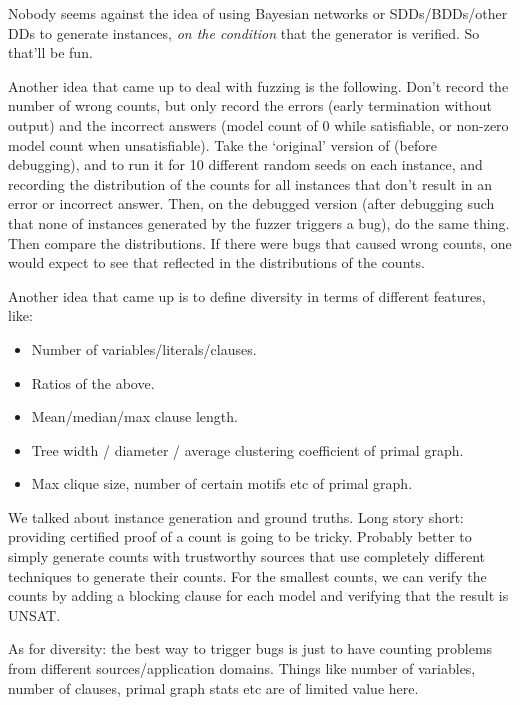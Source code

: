 \documentclass[a4paper]{tufte-handout}
\begin{document}
	Nobody seems against the idea of using Bayesian networks or SDDs/BDDs/other DDs to generate instances, {\em on the condition} that the generator is verified.
	So that'll be fun.
	
	Another idea that came up to deal with fuzzing \approxmc{} is the following. 
	Don't record the number of wrong counts, but only record the errors (early termination without output) and the incorrect answers (model count of 0 while satisfiable, or non-zero model count when unsatisfiable). 
	Take the `original' version of \approxmc{} (before debugging), and to run it for 10 different random seeds on each instance, and recording the distribution of the counts for all instances that don't result in an error or incorrect answer. 
	Then, on the debugged version (after debugging such that none of instances generated by the fuzzer triggers a bug), do the same thing.
	Then compare the distributions.
	If there were bugs that caused wrong counts, one would expect to see that reflected in the distributions of the counts.
	
	Another idea that came up is to define diversity in terms of different features, like:
	\begin{itemize}
		\item Number of variables/literals/clauses.
		\item Ratios of the above.
		\item Mean/median/max clause length.
		\item Tree width / diameter / average clustering coefficient of primal graph.
		\item Max clique size, number of certain motifs etc of primal graph.
	\end{itemize}
	
	\noindent\hrulefill
	
	
	
	We talked about instance generation and ground truths.
	Long story short: providing certified proof of a count is going to be tricky.
	Probably better to simply generate counts with trustworthy sources that use completely different techniques to generate their counts.
	For the smallest counts, we can verify the counts by adding a blocking clause for each model and verifying that the result is UNSAT.
	
	As for diversity: the best way to trigger bugs is just to have counting problems from different sources/application domains.
	Things like number of variables, number of clauses, primal graph stats etc are of limited value here.
	
\end{document}
